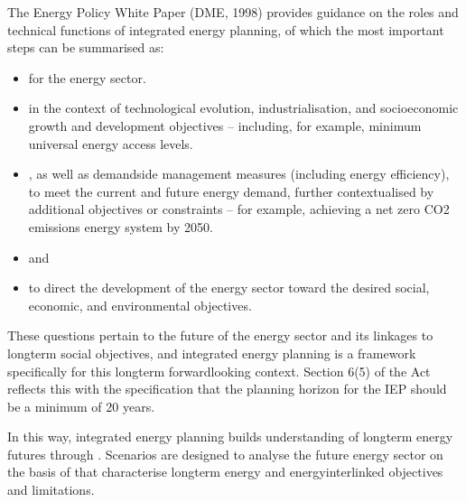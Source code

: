 \documentclass[letterpaper,10pt,english]{jupyterBook}
\begin{document}
\sphinxAtStartPar
The Energy Policy White Paper (DME, 1998) provides guidance on the roles and technical functions of integrated energy planning, of which the most important steps can be summarised as:
\begin{itemize}
\item {} 
\sphinxAtStartPar
{} for the energy sector.

\item {} 
\sphinxAtStartPar
{} in the context of technological evolution, industrialisation, and socio\sphinxhyphen{}economic growth and development objectives – including, for example, minimum universal energy access levels.

\item {} 
\sphinxAtStartPar
{}, as well as demand\sphinxhyphen{}side management measures (including energy efficiency), to meet the current and future energy demand, further contextualised by additional objectives or constraints – for example, achieving a net zero CO2 emissions energy system by 2050.

\item {} 
\sphinxAtStartPar
{} and 

\item {} 
\sphinxAtStartPar
{} to direct the development of the energy sector toward the desired social, economic, and environmental objectives.

\end{itemize}

\sphinxAtStartPar
These questions pertain to the  future of the energy sector and its linkages to long\sphinxhyphen{}term social objectives, and integrated energy planning is a framework specifically for this long\sphinxhyphen{}term forward\sphinxhyphen{}looking context. Section 6(5) of the Act reflects this with the specification that the planning horizon for the IEP should be a minimum of 20 years.

\sphinxAtStartPar
In this way, integrated energy planning builds understanding of long\sphinxhyphen{}term energy futures through . Scenarios are designed to analyse the future energy sector on the basis of  that characterise long\sphinxhyphen{}term energy and energy\sphinxhyphen{}interlinked objectives and limitations.
\end{document}
